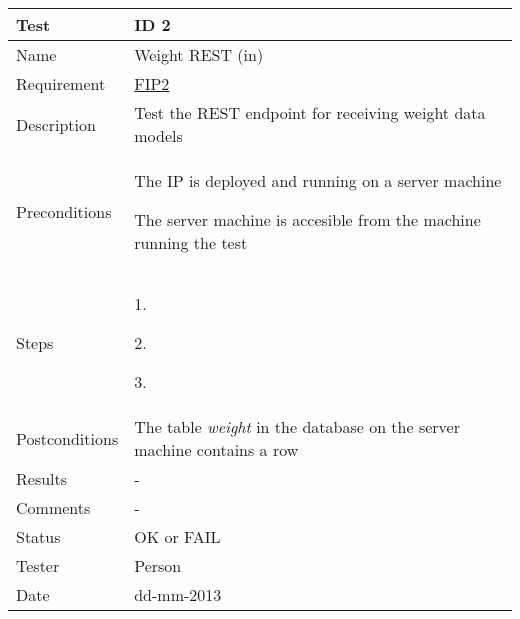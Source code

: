 \begin{table}
\begin{center}
\begin{tabular}{ | l | p{10cm} | }
	\hline
	\textbf{Test}	&	\textbf{ID 2} \\
	\hline\noalign{\smallskip}\noalign{\smallskip}\hline
	Name				& Weight REST (in) \\
	Requirement			& \hyperref[table:reqip]{FIP2} \\
	Description			& Test the REST endpoint for receiving weight data models \\
	Preconditions		&	\par The IP is deployed and running on a server machine
							\par The server machine is accesible from the machine running the test \\
	Steps 				&	\par 1. 
							\par 2. 
							\par 3.  \\
	Postconditions		& The table \textit{weight} in the database on the server machine contains a row \\
	Results				& - \\
	Comments			& - \\
	Status				& OK or FAIL \\
	Tester				& Person \\
	Date				& dd-mm-2013 \\
	\hline
\end{tabular}
\end{center}
\end{table}

